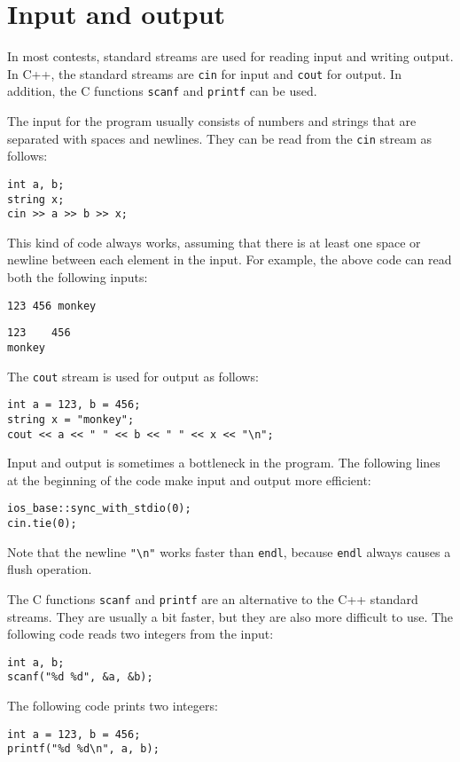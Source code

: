 \section{Input and output}


In most contests, standard streams are used for
reading input and writing output.
In C++, the standard streams are
\texttt{cin} for input and \texttt{cout} for output.
In addition, the C functions
\texttt{scanf} and \texttt{printf} can be used.

The input for the program usually consists of
numbers and strings that are separated with
spaces and newlines.
They can be read from the \texttt{cin} stream
as follows:

\begin{lstlisting}
int a, b;
string x;
cin >> a >> b >> x;
\end{lstlisting}

This kind of code always works,
assuming that there is at least one space
or newline between each element in the input.
For example, the above code can read
both the following inputs:
\begin{lstlisting}
123 456 monkey
\end{lstlisting}
\begin{lstlisting}
123    456
monkey
\end{lstlisting}
The \texttt{cout} stream is used for output
as follows:
\begin{lstlisting}
int a = 123, b = 456;
string x = "monkey";
cout << a << " " << b << " " << x << "\n";
\end{lstlisting}

Input and output is sometimes
a bottleneck in the program.
The following lines at the beginning of the code
make input and output more efficient:

\begin{lstlisting}
ios_base::sync_with_stdio(0);
cin.tie(0);
\end{lstlisting}

Note that the newline \texttt{"\textbackslash n"}
works faster than \texttt{endl},
because \texttt{endl} always causes
a flush operation.

The C functions \texttt{scanf}
and \texttt{printf} are an alternative
to the C++ standard streams.
They are usually a bit faster,
but they are also more difficult to use.
The following code reads two integers from the input:
\begin{lstlisting}
int a, b;
scanf("%d %d", &a, &b);
\end{lstlisting}
The following code prints two integers:
\begin{lstlisting}
int a = 123, b = 456;
printf("%d %d\n", a, b);
\end{lstlisting}

